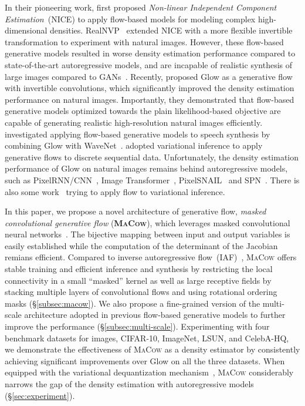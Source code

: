 \documentclass{article}
\begin{document}
In their pioneering work, \citet{dinh2014nice} first proposed \emph{Non-linear Independent Component Estimation}~(NICE) to apply flow-based models for modeling complex high-dimensional densities.
RealNVP~\citep{dinh2016density} extended NICE with a more flexible invertible transformation to experiment with natural images. 
However, these flow-based generative models resulted in worse density estimation performance compared to state-of-the-art autoregressive models, and are incapable of realistic synthesis of large images compared to GANs~\citep{karras2017progressive,brock2018large}.
Recently, \citet{kingma2018glow} proposed Glow as a generative flow with invertible  convolutions, which significantly improved the density estimation performance on natural images.
Importantly, they demonstrated that flow-based generative models optimized towards the plain likelihood-based objective are capable of generating realistic high-resolution natural images efficiently. 
\citet{prenger2018waveglow} investigated applying flow-based generative models to speech synthesis by combining Glow with WaveNet~\citep{van2016wavenet}.
\citet{ziegler2019latent} adopted variational inference to apply generative flows to discrete sequential data.
Unfortunately, the density estimation performance of Glow on natural images remains behind autoregressive models, such as PixelRNN/CNN~\citep{oord2016pixel,salimans2017pixelcnn++}, Image Transformer~\citep{parmar2018image}, PixelSNAIL~\citep{chen2017pixelsnail} and SPN~\citep{menick2018generating}.
There is also some work~\citep{rezende2015variational,kingma2016improved,zheng2017} trying to apply flow to variational inference. 

In this paper, we propose a novel architecture of generative flow, \emph{masked convolutional generative flow} (\textbf{\textsc{MaCow}}), which leverages masked convolutional neural networks~\citep{oord2016pixel}.
The bijective mapping between input and output variables is easily established while the computation of the determinant of the Jacobian remians efficient. 
Compared to inverse autoregressive flow~(IAF)~\citep{kingma2016improved}, \textsc{MaCow} offers stable training and efficient inference and synthesis by restricting the local connectivity in a small ``masked'' kernel as well as large receptive fields by stacking multiple layers of convolutional flows and using rotational ordering masks (\S\ref{subsec:macow}).
We also propose a fine-grained version of the multi-scale architecture adopted in previous flow-based generative models to further improve the performance (\S\ref{subsec:multi-scale}).
Experimenting with four benchmark datasets for images, CIFAR-10, ImageNet, LSUN, and CelebA-HQ, we demonstrate the effectiveness of \textsc{MaCow} as a density estimator by consistently achieving significant improvements over Glow on all the three datasets. 
When equipped with the variational dequantization mechanism~\citep{ho2019flow++}, \textsc{MaCow} considerably narrows the gap of the density estimation with autoregressive models (\S\ref{sec:experiment}).
\end{document}
